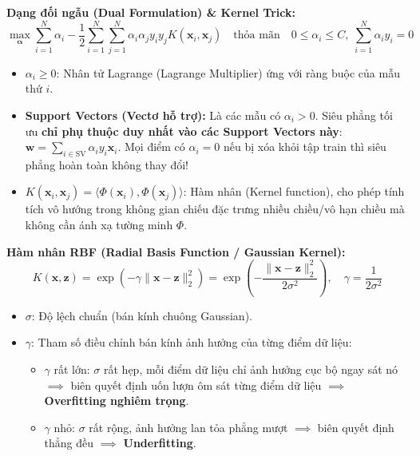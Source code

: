\documentclass[10pt,a4paper]{article}
\begin{document}
\textbf{Dạng đối ngẫu (Dual Formulation) \& Kernel Trick:}
\begin{equation}
    \max_{\boldsymbol{\alpha}} \sum_{i=1}^N \alpha_i - \frac{1}{2} \sum_{i=1}^N \sum_{j=1}^N \alpha_i \alpha_j y_i y_j K(\mathbf{x}_i, \mathbf{x}_j) \quad \text{thỏa mãn} \quad 0 \le \alpha_i \le C, \; \sum_{i=1}^N \alpha_i y_i = 0
\end{equation}
\begin{itemize}[leftmargin=*]
    \item $\alpha_i \ge 0$: Nhân tử Lagrange (Lagrange Multiplier) ứng với ràng buộc của mẫu thứ $i$.
    \item \textbf{Support Vectors (Vectơ hỗ trợ):} Là các mẫu có $\alpha_i > 0$. Siêu phẳng tối ưu \textbf{chỉ phụ thuộc duy nhất vào các Support Vectors này}: $\mathbf{w} = \sum_{i \in \text{SV}} \alpha_i y_i \mathbf{x}_i$. Mọi điểm có $\alpha_i = 0$ nếu bị xóa khỏi tập train thì siêu phẳng hoàn toàn không thay đổi!
    \item $K(\mathbf{x}_i, \mathbf{x}_j) = \langle \Phi(\mathbf{x}_i), \Phi(\mathbf{x}_j) \rangle$: Hàm nhân (Kernel function), cho phép tính tích vô hướng trong không gian chiếu đặc trưng nhiều chiều/vô hạn chiều mà không cần ánh xạ tường minh $\Phi$.
\end{itemize}

\textbf{Hàm nhân RBF (Radial Basis Function / Gaussian Kernel):}
\begin{equation}
    K(\mathbf{x}, \mathbf{z}) = \exp\left( -\gamma \|\mathbf{x} - \mathbf{z}\|_2^2 \right) = \exp\left( -\frac{\|\mathbf{x} - \mathbf{z}\|_2^2}{2\sigma^2} \right), \quad \gamma = \frac{1}{2\sigma^2}
\end{equation}
\begin{itemize}[leftmargin=*]
    \item $\sigma$: Độ lệch chuẩn (bán kính chuông Gaussian).
    \item $\gamma$: Tham số điều chỉnh bán kính ảnh hưởng của từng điểm dữ liệu:
    \begin{itemize}
        \item $\gamma$ rất lớn: $\sigma$ rất hẹp, mỗi điểm dữ liệu chỉ ảnh hưởng cục bộ ngay sát nó $\implies$ biên quyết định uốn lượn ôm sát từng điểm dữ liệu $\implies$ \textbf{Overfitting nghiêm trọng}.
        \item $\gamma$ nhỏ: $\sigma$ rất rộng, ảnh hưởng lan tỏa phẳng mượt $\implies$ biên quyết định thẳng đều $\implies$ \textbf{Underfitting}.
    \end{itemize}
\end{itemize}
\end{document}
